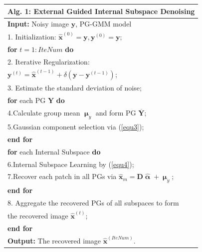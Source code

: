 \documentclass[10pt,twocolumn,letterpaper]{article}
\begin{document}
\begin{table}
\label{alg1}
\begin{tabular}{l}
\hline
\textbf{Alg. 1}: External Guided Internal Subspace Denoising
\\
\hline
\textbf{Input:} Noisy image $\mathbf{y}$, PG-GMM model
\\
1. Initialization: $\hat{\mathbf{x}}^{(0)}=\mathbf{y},\mathbf{y}^{(0)}=\mathbf{y}$;
\\
\textbf{for} $t = 1:IteNum$ \textbf{do}
\\
2. Iterative Regularization:
\\
\quad\quad\quad $\mathbf{y}^{(t)}=\hat{\mathbf{x}}^{(t-1)}+\delta(\mathbf{y}-\mathbf{y}^{(t-1)})$;
\\
3. Estimate the standard deviation of noise;
\\
\quad\textbf{for} each PG $\mathbf{Y}$ \textbf{do}
\\
4.\quad Calculate group mean $\boldsymbol{\upmu}_{y}$ and form PG $\mathbf{\overline{Y}}$;
\\
5.\quad Gaussian component selection via (\ref{equ3});
\\
\quad\textbf{end for}
\\
\quad\textbf{for} each Internal Subspace \textbf{do}
\\
6.\quad Internal Subspace Learning by (\ref{equ4});
\\
7.\quad Recover each patch in all PGs via $\hat{\mathbf{x}}_{m}=\mathbf{D}\hat{\boldsymbol{\upalpha}}+\boldsymbol{\upmu}_{y}$;
\\
\quad\textbf{end for}
\\
8. Aggregate the recovered PGs of all subspaces to form
\\
\quad the recovered image $\hat{\mathbf{x}}^{(t)}$;
\\
\textbf{end for}
\\
\textbf{Output:} The recovered image $\hat{\mathbf{x}}^{(IteNum)}$.\\
\hline
\end{tabular}
\end{table}


\end{document}
